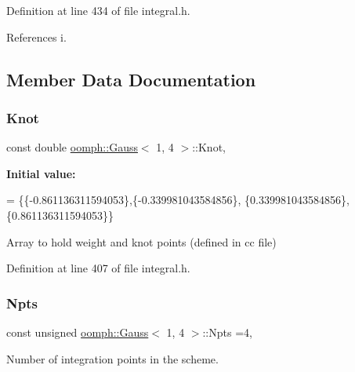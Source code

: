 Definition at line 434 of file integral.\+h.



References i.



\subsection{Member Data Documentation}
\mbox{\label{classoomph_1_1Gauss_3_011_00_014_01_4_a2d2fc8511d8d60b5151b427bbe1b2187}} 
\subsubsection{\texorpdfstring{Knot}{Knot}}
{\footnotesize\ttfamily const double \hyperlink{classoomph_1_1Gauss}{oomph\+::\+Gauss}$<$ 1, 4 $>$\+::Knot\hspace{0.3cm}{\ttfamily [static]}, {\ttfamily [private]}}

{\bfseries Initial value\+:}
\begin{DoxyCode}
= 
\{\{-0.861136311594053\},\{-0.339981043584856\}, \{0.339981043584856\},
 \{0.861136311594053\}\}
\end{DoxyCode}


Array to hold weight and knot points (defined in cc file) 



Definition at line 407 of file integral.\+h.

\mbox{\label{classoomph_1_1Gauss_3_011_00_014_01_4_a36bef895ea6c367b8dcf32e6d88c61cb}} 
\subsubsection{\texorpdfstring{Npts}{Npts}}
{\footnotesize\ttfamily const unsigned \hyperlink{classoomph_1_1Gauss}{oomph\+::\+Gauss}$<$ 1, 4 $>$\+::Npts =4\hspace{0.3cm}{\ttfamily [static]}, {\ttfamily [private]}}



Number of integration points in the scheme. 



